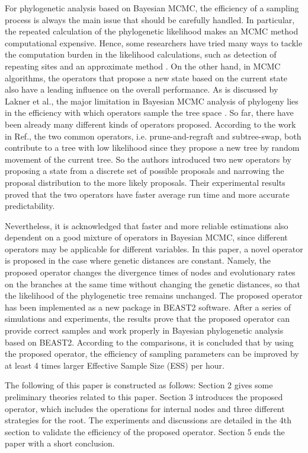 \documentclass{bmcart}
\begin{document}
For phylogenetic analysis based on Bayesian MCMC, the efficiency of a sampling process is always the main issue that should be carefully handled. In particular, the repeated calculation of the phylogenetic likelihood makes an MCMC method computational expensive. Hence, some researchers have tried many ways to tackle the computation burden in the likelihood calculations, such as detection of repeating sites \cite{kobert2017efficient} and an approximate method \cite{reis2011approximate}. On the other hand, in MCMC algorithms, the operators that propose a new state based on the current state also have a leading influence on the overall performance. As is discussed by Lakner et al., the major limitation in Bayesian MCMC analysis of phylogeny lies in the efficiency with which operators sample the tree space \cite{lakner2008efficiency}. So far, there have been already many different kinds of operators proposed. According to the work in Ref.\cite{hohna2011guided}, the two common operators, i.e. prune-and-regraft and subtree-swap, both contribute to a tree with low likelihood since they propose a new tree by random movement of the current tree. So the authors introduced two new operators by proposing a state from a discrete set of possible proposals and narrowing the proposal distribution to the more likely proposals. Their experimental results proved that the two operators have faster average run time and more accurate predictability.

Nevertheless, it is acknowledged that faster and more reliable estimations also dependent on a good mixture of operators in Bayesian MCMC, since different operators may be applicable for different variables. In this paper, a novel operator is proposed in the case where genetic distances are constant. Namely, the proposed operator changes the divergence times of nodes and evolutionary rates on the branches at the same time without changing the genetic distances, so that the likelihood of the phylogenetic tree remains unchanged. The proposed operator has been implemented as a new package in BEAST2 software. After a series of simulations and experiments, the results prove that the proposed operator can provide correct samples and work properly in Bayesian phylogenetic analysis based on BEAST2. According to the comparisons, it is concluded that by using the proposed operator, the efficiency of sampling parameters can be improved by at least 4 times larger Effective Sample Size (ESS) per hour.

The following of this paper is constructed as follows: Section 2 gives some preliminary theories related to this paper. Section 3 introduces the proposed operator, which includes the operations for internal nodes and three different strategies for the root. The experiments and discussions are detailed in the 4th section to validate the efficiency of the proposed operator. Section 5 ends the paper with a short conclusion.
\end{document}
